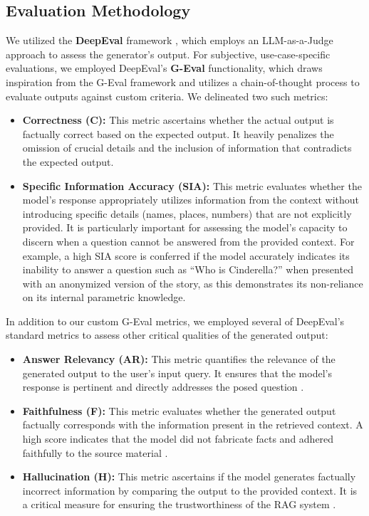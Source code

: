 \subsection{Evaluation Methodology}\label{sec:evaluation-methodology}
We utilized the \textbf{DeepEval} framework \autocite{deepeval2023}, which employs an LLM-as-a-Judge approach to assess the generator's output. For subjective, use-case-specific evaluations, we employed DeepEval's \textbf{G-Eval} functionality, which draws inspiration from the G-Eval framework \autocite{liu2023gevalnlgevaluationusing} and utilizes a chain-of-thought process to evaluate outputs against custom criteria. We delineated two such metrics:
\begin{itemize}
    \item \textbf{Correctness (C):} This metric ascertains whether the actual output is factually correct based on the expected output. It heavily penalizes the omission of crucial details and the inclusion of information that contradicts the expected output.
    \item \textbf{Specific Information Accuracy (SIA):} This metric evaluates whether the model's response appropriately utilizes information from the context without introducing specific details (names, places, numbers) that are not explicitly provided. It is particularly important for assessing the model's capacity to discern when a question cannot be answered from the provided context. For example, a high SIA score is conferred if the model accurately indicates its inability to answer a question such as \enquote{Who is Cinderella?} when presented with an anonymized version of the story, as this demonstrates its non-reliance on its internal parametric knowledge.
\end{itemize}

In addition to our custom G-Eval metrics, we employed several of DeepEval's standard metrics to assess other critical qualities of the generated output:
\begin{itemize}
    \item \textbf{Answer Relevancy (AR):} This metric quantifies the relevance of the generated output to the user's input query. It ensures that the model's response is pertinent and directly addresses the posed question \autocite{deepeval2023}.
    \item \textbf{Faithfulness (F):} This metric evaluates whether the generated output factually corresponds with the information present in the retrieved context. A high score indicates that the model did not fabricate facts and adhered faithfully to the source material \autocite{deepeval2023}.
    \item \textbf{Hallucination (H):} This metric ascertains if the model generates factually incorrect information by comparing the output to the provided context. It is a critical measure for ensuring the trustworthiness of the RAG system \autocite{deepeval2023}.
\end{itemize}


